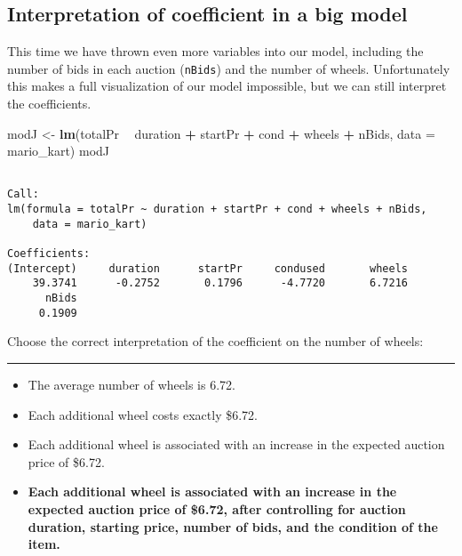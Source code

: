 \documentclass[]{book}
\newenvironment{Shaded}{\begin{snugshade}}{\end{snugshade}}
\newcommand{\KeywordTok}[1]{\textcolor[rgb]{0.13,0.29,0.53}{\textbf{#1}}}
\newcommand{\DataTypeTok}[1]{\textcolor[rgb]{0.13,0.29,0.53}{#1}}
\newcommand{\StringTok}[1]{\textcolor[rgb]{0.31,0.60,0.02}{#1}}
\newcommand{\OperatorTok}[1]{\textcolor[rgb]{0.81,0.36,0.00}{\textbf{#1}}}
\newcommand{\NormalTok}[1]{#1}
\begin{document}
\subsection*{Interpretation of coefficient in a big
model}\label{interpretation-of-coefficient-in-a-big-model}

This time we have thrown even more variables into our model, including
the number of bids in each auction (\texttt{nBids}) and the number of
wheels. Unfortunately this makes a full visualization of our model
impossible, but we can still interpret the coefficients.

\begin{Shaded}
\begin{Highlighting}[]
\NormalTok{modJ <-}\StringTok{ }\KeywordTok{lm}\NormalTok{(totalPr }\OperatorTok{~}\StringTok{ }\NormalTok{duration }\OperatorTok{+}\StringTok{ }\NormalTok{startPr }\OperatorTok{+}\StringTok{ }\NormalTok{cond }\OperatorTok{+}\StringTok{ }\NormalTok{wheels }\OperatorTok{+}\StringTok{ }\NormalTok{nBids, }
    \DataTypeTok{data =}\NormalTok{ mario_kart)}
\NormalTok{modJ}
\end{Highlighting}
\end{Shaded}

\begin{verbatim}

Call:
lm(formula = totalPr ~ duration + startPr + cond + wheels + nBids, 
    data = mario_kart)

Coefficients:
(Intercept)     duration      startPr     condused       wheels  
    39.3741      -0.2752       0.1796      -4.7720       6.7216  
      nBids  
     0.1909  
\end{verbatim}

Choose the correct interpretation of the coefficient on the number of
wheels:

\begin{center}\rule{0.5\linewidth}{\linethickness}\end{center}

\begin{itemize}
\item
  The average number of wheels is 6.72.
\item
  Each additional wheel costs exactly \$6.72.
\item
  Each additional wheel is associated with an increase in the expected
  auction price of \$6.72.
\item
  \textbf{Each additional wheel is associated with an increase in the
  expected auction price of \$6.72, after controlling for auction
  duration, starting price, number of bids, and the condition of the
  item.}
\end{itemize}
\end{document}
